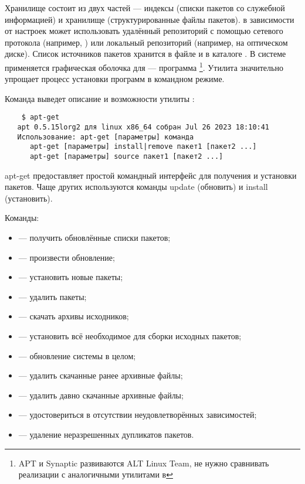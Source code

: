 Хранилище состоит из двух частей --- индексы (списки пакетов со служебной информацией) и
хранилище (структурированные файлы пакетов).
 в зависимости от настроек может использовать удалённый репозиторий
с помощью сетевого протокола (например, ) или локальный репозиторий (например,
на оптическом диске).
Список источников пакетов хранится в файле
 и в каталоге . В системе 
применяется графическая оболочка для  --- программа \footnote{APT и Synaptic
	развиваются ALT Linux Team, не нужно сравнивать реализации с аналогичными утилитами в }.
Утилита  значительно упрощает процесс установки программ в командном режиме.


Команда  выведет описание и возможности утилиты :
\begin{verbatim}
    $ apt-get
   apt 0.5.15lorg2 для linux x86_64 собран Jul 26 2023 18:10:41
   Использование: apt-get [параметры] команда
      apt-get [параметры] install|remove пакет1 [пакет2 ...]
      apt-get [параметры] source пакет1 [пакет2 ...]
\end{verbatim}

apt-get предоставляет простой командный интерфейс для получения и
установки пакетов. Чаще других используются команды update (обновить)
и install (установить).
	
Команды:
\begin{itemize}
	\item {} --- получить обновлённые списки пакетов;
	\item {} --- произвести обновление;
	\item {} --- установить новые пакеты;
	\item {} --- удалить пакеты;
	\item {} --- скачать архивы исходников;
	\item {} --- установить всё необходимое для сборки исходных пакетов;
	\item {} --- обновление системы в целом;
	\item {} --- удалить скачанные ранее архивные файлы;
	\item {} --- удалить давно скачанные архивные файлы;
	\item {} --- удостовериться в отсутствии неудовлетворённых зависимостей;
	\item {} --- удаление неразрешенных дупликатов пакетов.
\end{itemize}
	
